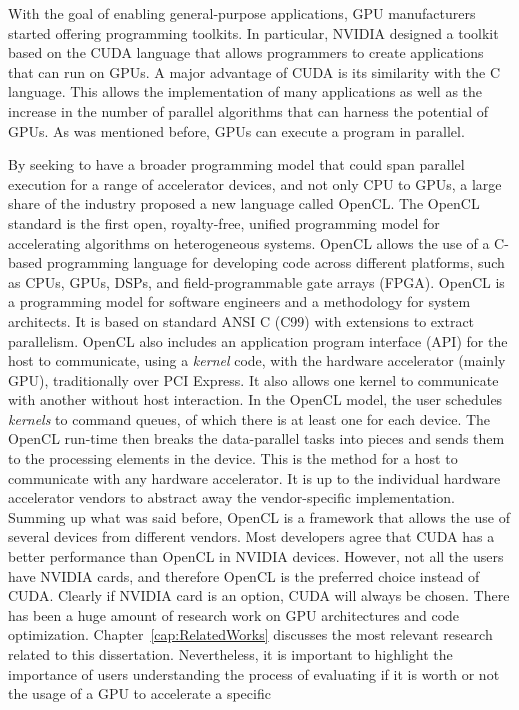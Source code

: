 \documentclass[Ingles]{ic-tese-v1}
\newcommand{\rcap}[1]{Chapter~\ref{cap:#1}}
\newcommand{\tit}[1]{{\textit{#1}}}
\begin{document}
With the goal of enabling general-purpose applications, GPU manufacturers
started offering programming  toolkits. In particular, NVIDIA designed a toolkit
based on the CUDA  language that  allows programmers to create applications
that can run on GPUs. A major advantage
of CUDA is its similarity with the C language.  This allows the implementation
of many applications as well as the increase in the number of parallel
algorithms that can  harness the potential of GPUs. As was mentioned before, GPUs
can execute a program in parallel.

By seeking to have a  broader  programming model that could  span parallel execution
for a range of accelerator devices, and not only CPU to GPUs, a large share of
the industry proposed a new language called OpenCL. The OpenCL
standard is the first open, royalty-free, unified programming model for
accelerating algorithms on heterogeneous systems. OpenCL allows the use of a
C-based programming language for developing code across different platforms,
such as CPUs, GPUs, DSPs, and field-programmable gate arrays (FPGA).  OpenCL
is a programming model for software engineers and a methodology for system
architects. It is based on standard ANSI C (C99) with extensions to extract
parallelism. OpenCL also includes an application program interface (API) for
the host to communicate, using a \tit{kernel} code, with the hardware accelerator (mainly GPU),
traditionally over PCI Express. It also allows one kernel to communicate with another
without host interaction.  In the OpenCL model, the user schedules \tit{kernels} to
command queues, of which there is at least one for each device. The OpenCL
run-time then breaks the data-parallel tasks into pieces and sends them to the
processing elements in the device. This is the method for a host to communicate
with any hardware accelerator. It is up to the individual hardware accelerator
vendors to abstract away the vendor-specific implementation.  Summing up what
was said before, OpenCL is a framework that allows the use of several devices
from different vendors. Most developers agree that CUDA has a better
performance than OpenCL in NVIDIA devices. However, not all the users have
NVIDIA cards, and  therefore OpenCL is the preferred choice  instead of CUDA.
Clearly if NVIDIA card is an option, CUDA will always be chosen.
There has been a huge amount of research work on GPU architectures and code
optimization. \rcap{RelatedWorks} discusses the most relevant  research related to this
dissertation. Nevertheless, it is important to highlight the importance of users understanding the process of evaluating  if it is worth or not the usage of a GPU to accelerate a specific
\end{document}
